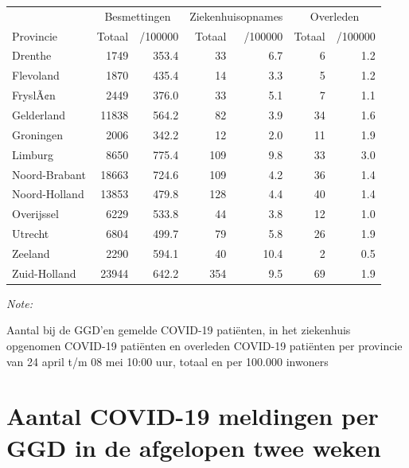 \documentclass[
  english,
  man,floatsintext]{apa6}
\begin{document}
\begin{table}
\centering
\begin{threeparttable}
\begin{tabular}{lrrrrrr}
\toprule
\multicolumn{1}{c}{ } & \multicolumn{2}{c}{Besmettingen} & \multicolumn{2}{c}{Ziekenhuisopnames} & \multicolumn{2}{c}{Overleden} \\
\cmidrule(l{3pt}r{3pt}){2-3} \cmidrule(l{3pt}r{3pt}){4-5} \cmidrule(l{3pt}r{3pt}){6-7}
Provincie & Totaal & /100000 & Totaal & /100000 & Totaal & /100000\\
\midrule
Drenthe & 1749 & 353.4 & 33 & 6.7 & 6 & 1.2\\
Flevoland & 1870 & 435.4 & 14 & 3.3 & 5 & 1.2\\
FryslÃ¢n & 2449 & 376.0 & 33 & 5.1 & 7 & 1.1\\
Gelderland & 11838 & 564.2 & 82 & 3.9 & 34 & 1.6\\
Groningen & 2006 & 342.2 & 12 & 2.0 & 11 & 1.9\\
Limburg & 8650 & 775.4 & 109 & 9.8 & 33 & 3.0\\
Noord-Brabant & 18663 & 724.6 & 109 & 4.2 & 36 & 1.4\\
Noord-Holland & 13853 & 479.8 & 128 & 4.4 & 40 & 1.4\\
Overijssel & 6229 & 533.8 & 44 & 3.8 & 12 & 1.0\\
Utrecht & 6804 & 499.7 & 79 & 5.8 & 26 & 1.9\\
Zeeland & 2290 & 594.1 & 40 & 10.4 & 2 & 0.5\\
Zuid-Holland & 23944 & 642.2 & 354 & 9.5 & 69 & 1.9\\
\bottomrule
\end{tabular}
\begin{tablenotes}
\item \textit{Note: } 
\item Aantal bij de GGD’en gemelde COVID-19 patiënten, in het ziekenhuis opgenomen COVID-19 patiënten en overleden COVID-19 patiënten per provincie van 24 april t/m 08 mei 10:00 uur, totaal en per 100.000 inwoners
\end{tablenotes}
\end{threeparttable}
\end{table}

\newpage

\hypertarget{aantal-covid-19-meldingen-per-ggd-in-de-afgelopen-twee-weken}{%
\section{Aantal COVID-19 meldingen per GGD in de afgelopen twee weken}\label{aantal-covid-19-meldingen-per-ggd-in-de-afgelopen-twee-weken}}
\end{document}

